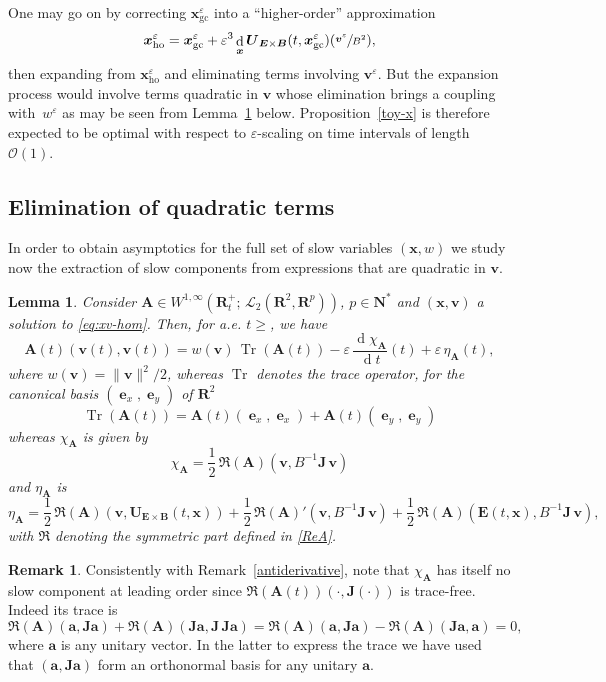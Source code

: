 \documentclass[10pt]{amsart}
\let\mathcal\mathscr
\let\eps\varepsilon
\DeclareMathOperator\dD{d}\let\dd\dD
\DeclareMathOperator{\Tr}{Tr}
\theoremstyle{plain}
\newtheorem{lemma}[theorem]{Lemma}
\theoremstyle{definition}
\newtheorem{remark}[theorem]{Remark}
\newcommand\br{\begin{remark}}
\newcommand\er{\end{remark}}
\newcommand{\bl}{\begin{lemma}}
\newcommand{\el}{\end{lemma}}
\newcommand\R{\mathbf R}
\newcommand{\N}{\mathbf N}
\newcommand\bA{{\boldsymbol A}}
\newcommand\bB{{\boldsymbol B}}
\newcommand\bE{{\boldsymbol E}}
\newcommand\bJ{{\boldsymbol J}}
\newcommand\bU{{\boldsymbol U}}
\newcommand\bfa{{\boldsymbol a}}
\newcommand\bfv{{\boldsymbol v}}
\newcommand\bfx{{\boldsymbol x}}
\newcommand\cL{{\mathcal L}}
\newcommand\cO{{\mathcal O}}
\DeclareMathOperator{\beD}{\boldsymbol{e}}
\newcommand\eDx{\beD_x}
\newcommand\eDy{\beD_y}
\let\e w
\newcommand{\GC}{\bfx_\mathrm{gc}}
\newcommand{\EcB}{\bU_{\bE\times\bB}}
\begin{document}
One may go on by correcting $\GC^\eps$ into a ``higher-order'' approximation
\[
\bfx_\mathrm{ho}^\eps
=\GC^\eps+\eps^3\dD_\bfx\EcB(t,\GC^\eps)(\sfrac{\bfv^\eps}{B^2}),
\]
then expanding from $\bfx_\mathrm{ho}^\eps$ and eliminating terms involving $\bfv^\eps$. But the expansion process would involve terms quadratic in $\bfv$ whose elimination brings a coupling with~$\e^\eps$ as may be seen from Lemma~\ref{toy-2nd} below. Proposition~\ref{toy-x} is therefore expected to be optimal with respect to $\eps$-scaling on time intervals of length $\cO(1)$.

\subsection{Elimination of quadratic terms}

In order to obtain asymptotics for the full set of slow variables $(\bfx,\e)$ we study now the extraction of slow components from expressions that are quadratic in $\bfv$.

\bl
\label{toy-2nd}
Consider $\bA\in W^{1,\infty}\left(\R^+_t; \,\cL_2(\R^2,\R^p)\right)$, $p\in\N^*$ and $(\bfx,\bfv)$ a solution to \eqref{eq:xv-hom}. Then, for
a.e. $t\geq$, we have
\[
\bA(t)(\bfv(t),\bfv(t))
=\e(\bfv)\,\Tr(\bA(t))-\eps\,\frac{\dD\chi_\bA}{\dD t}(t)+\eps\,\eta_\bA(t),
\]
where $\e(\bfv)=\|\bfv\|^2/2$, whereas $\Tr$ denotes the trace
operator, for the canonical basis $(\eDx,\eDy)$ of $\R^2$
\[
\Tr(\bA(t)) = \bA(t)(\eDx,\eDx) + \bA(t)(\eDy,\eDy)
\]
whereas $\chi_\bA$ is given by
\[
\chi_\bA =\frac12\,\Re(\bA)\left(\bfv,B^{-1}\bJ\,\bfv\right)
\]
and $\eta_\bA$ is
\[
\eta_\bA =
\frac12\,\Re(\bA)(\bfv,\EcB(t,\bfx))
+\frac12\,\Re(\bA)'\left(\bfv,B^{-1}\bJ\,\bfv\right)+\frac12\,\Re(\bA)\left(\bE(t,\bfx),B^{-1}\bJ\,\bfv\right),
\]
with $\Re$ denoting the symmetric part defined in \eqref{ReA}.
\el

\br
\label{trace-free}
Consistently with Remark~\ref{antiderivative}, note that $\chi_\bA$ has itself no slow component at leading order since $\Re(\bA(t))\left(\cdot,\bJ(\cdot)\right)$ is trace-free. Indeed its trace is
\[
\Re(\bA)\left(\bfa,\bJ\bfa\right)+\Re(\bA)\left(\bJ\bfa,\bJ\,\bJ\bfa\right)
=\Re(\bA)\left(\bfa,\bJ\bfa\right)-\Re(\bA)\left(\bJ\bfa,\bfa\right)=0,
\]
where $\bfa$ is any unitary vector. In the latter to express the trace we have used that $(\bfa,\bJ\bfa)$ form an orthonormal basis for any unitary $\bfa$.
\er
\end{document}
